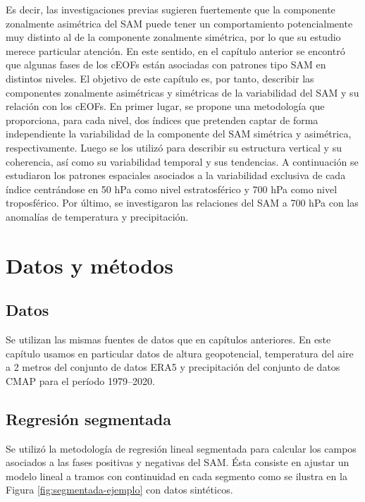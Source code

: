 \documentclass[12pt,oneside,a4paper]{reedthesis}
\begin{document}
Es decir, las investigaciones previas sugieren fuertemente que la componente zonalmente asimétrica del SAM puede tener un comportamiento potencialmente muy distinto al de la componente zonalmente simétrica, por lo que su estudio merece particular atención.
En este sentido, en el capítulo anterior se encontró que algunas fases de los cEOFs están asociadas con patrones tipo SAM en distintos niveles.
El objetivo de este capítulo es, por tanto, describir las componentes zonalmente asimétricas y simétricas de la variabilidad del SAM y su relación con los cEOFs.
En primer lugar, se propone una metodología que proporciona, para cada nivel, dos índices que pretenden captar de forma independiente la variabilidad de la componente del SAM simétrica y asimétrica, respectivamente.
Luego se los utilizó para describir su estructura vertical y su coherencia, así como su variabilidad temporal y sus tendencias.
A continuación se estudiaron los patrones espaciales asociados a la variabilidad exclusiva de cada índice centrándose en 50 hPa como nivel estratosférico y 700 hPa como nivel troposférico.
Por último, se investigaron las relaciones del SAM a 700 hPa con las anomalías de temperatura y precipitación.

\hypertarget{datos-y-muxe9todos}{%
\section{Datos y métodos}\label{datos-y-muxe9todos}}

\hypertarget{datos-2}{%
\subsection{Datos}\label{datos-2}}

Se utilizan las mismas fuentes de datos que en capítulos anteriores.
En este capítulo usamos en particular datos de altura geopotencial, temperatura del aire a 2 metros del conjunto de datos ERA5 y precipitación del conjunto de datos CMAP para el período 1979--2020.

\hypertarget{regresiuxf3n-segmentada}{%
\subsection{Regresión segmentada}\label{regresiuxf3n-segmentada}}

Se utilizó la metodología de regresión lineal segmentada para calcular los campos asociados a las fases positivas y negativas del SAM.
Ésta consiste en ajustar un modelo lineal a tramos con continuidad en cada segmento como se ilustra en la Figura \ref{fig:segmentada-ejemplo} con datos sintéticos.
\end{document}
